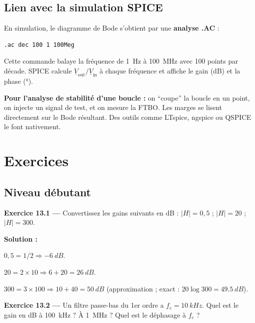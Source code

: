 \documentclass[12pt,a4paper,twoside]{book}
\begin{document}
\subsection{Lien avec la simulation SPICE}

\begin{pratique}
En simulation, le diagramme de Bode s'obtient par une \textbf{analyse .AC} :

\begin{verbatim}
.ac dec 100 1 100Meg
\end{verbatim}

Cette commande balaye la fréquence de \SI{1}{Hz} à \SI{100}{MHz} avec 100 points par décade. SPICE calcule $\underline{V}_{\text{out}}/\underline{V}_{\text{in}}$ à chaque fréquence et affiche le gain (dB) et la phase (°).

\textbf{Pour l'analyse de stabilité d'une boucle :} on ``coupe'' la boucle en un point, on injecte un signal de test, et on mesure la FTBO. Les marges se lisent directement sur le Bode résultant. Des outils comme LTspice, ngspice ou QSPICE le font nativement.
\end{pratique}

\section*{Exercices}

\subsection*{Niveau débutant}

\textbf{Exercice 13.1 ---} Convertissez les gains suivants en dB : $|H| = 0{,}5$ ; $|H| = 20$ ; $|H| = 300$.

\begin{pratique}
\textbf{Solution :}

$0{,}5 = 1/2 \Rightarrow \SI{-6}{dB}$.

$20 = 2\times10 \Rightarrow 6 + 20 = \SI{+26}{dB}$.

$300 = 3\times100 \Rightarrow 10 + 40 = \SI{+50}{dB}$ (approximation ; exact : $20\log 300 = \SI{49.5}{dB}$).
\end{pratique}

\textbf{Exercice 13.2 ---} Un filtre passe-bas du 1er ordre a $f_c = \SI{10}{kHz}$. Quel est le gain en dB à \SI{100}{kHz} ? À \SI{1}{MHz} ? Quel est le déphasage à $f_c$ ?
\end{document}
